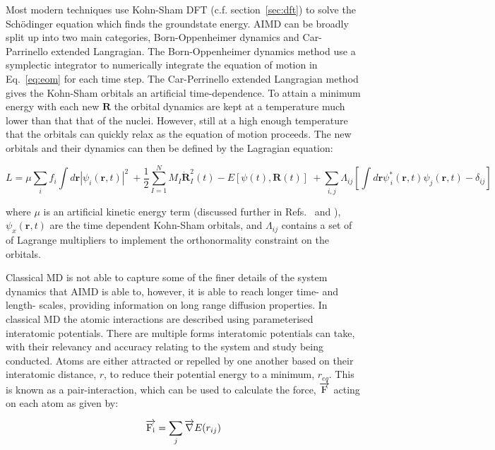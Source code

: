 \documentclass[../main.tex]{subfiles}
\begin{document}
Most modern techniques use Kohn-Sham DFT (c.f. section~\ref{sec:dft}) to solve the Sch\"{o}dinger equation which finds the groundstate energy. AIMD can be broadly split up into two main categories, Born-Oppenheimer dynamics and Car-Parrinello extended Langragian. The Born-Oppenheimer dynamics method use a symplectic integrator to numerically integrate the equation of motion in Eq.~\ref{eq:eom} for each time step. The Car-Perrinello extended Langragian method gives the Kohn-Sham orbitals an artificial time-dependence. To attain a minimum energy with each new $\textbf{R}$ the orbital dynamics are kept at a temperature much lower than that that of the nuclei. However, still at a high enough temperature that the orbitals can quickly relax as the equation of motion proceeds. The new orbitals and their dynamics can then be defined by the Lagragian equation:\cite{Car1985}

\begin{equation}
    L=\mu \sum_i f_i \int d\textbf{r}|\psi_i(\textbf{r},t)|^2 \
    +\frac{1}{2}\sum^N_{I=1} M_I\dot{\textbf{R}}^2_I (t)- E\left[{\psi(t)}, \textbf{R}(t)\right] \
    +\sum_{i,j} \Lambda_{ij}\left[\int d\textbf{r}\psi^*_{\,i}(\textbf{r},t)\psi_j(\textbf{r}, t)- \delta_{ij}\right]
\end{equation}

where $\mu$ is an artificial kinetic energy term (discussed further in Refs.~ and ), $\psi_x(\textbf{r},t)$ are the time dependent Kohn-Sham orbitals, and $\Lambda_{ij}$ contains a set of of Lagrange multipliers to implement the orthonormality constraint on the orbitals. 

Classical MD is not able to capture some of the finer details of the system dynamics that AIMD is able to, however, it is able to reach longer time- and length- scales, providing information on long range diffusion properties. In classical MD the atomic interactions are described using parameterised interatomic potentials. There are multiple forms interatomic potentials can take, with their relevancy and accuracy relating to the system and study being conducted. Atoms are either attracted or repelled by one another based on their interatomic distance, $r$, to reduce their potential energy to a minimum, $r_{eq}$. This is known as a pair-interaction, which can be used to calculate the force, $\overrightarrow{\rm F}$ acting on each atom as given by:

\begin{equation}
    \overrightarrow{\rm F_i} = \sum_j {\overrightarrow{\nabla}}E(r_{ij})
\end{equation}
\end{document}
